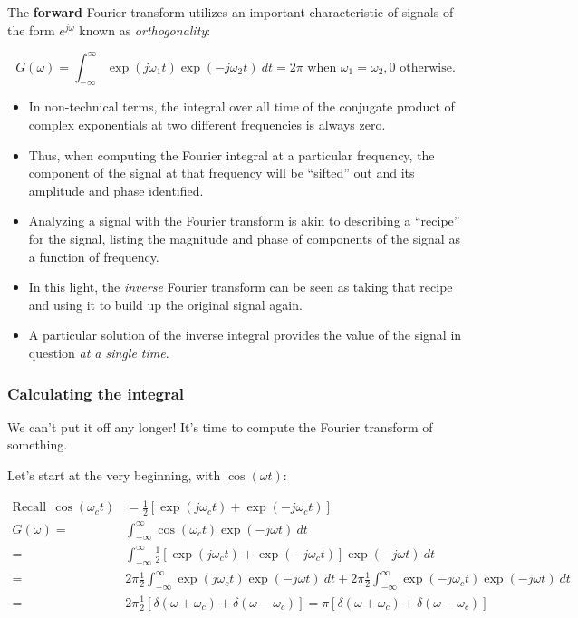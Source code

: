 \documentclass[11pt]{report}
\begin{document}
The \textbf{forward} Fourier transform utilizes an important
characteristic of signals of the form $e^{j\omega}$ known as \textit{orthogonality}:

\begin{equation*}
G(\omega)= \int^{\infty}_{-\infty}\exp(j\omega_1
t)\exp(-j\omega_2 t)~dt = 2\pi \text{ when }\omega_1=\omega_2, 0
\text{ otherwise}.
\end{equation*}

\begin{itemize}
\item In non-technical terms, the integral over all time of the
conjugate product of complex exponentials at two
different frequencies is always zero.

\item Thus, when computing the Fourier integral at a particular frequency,
the component of the signal at that frequency will be ``sifted'' out
and its amplitude and phase identified.

\item Analyzing a signal with the Fourier transform is akin to describing a
``recipe'' for the signal, listing the magnitude and phase of components of the signal as a
function of frequency.

\item In this light, the \textit{inverse} Fourier transform can be seen as taking
that recipe and using it to build up the original signal again. 

\item A particular solution of the inverse integral provides the value of
the signal in question \textit{at a single time}.

\end{itemize}

\subsubsection*{Calculating the integral}
We can't put it off any longer!  It's time to compute the Fourier
transform of something.  

Let's start at the very beginning, with $\cos(\omega t)$:

\begin{equation}
\begin{split}
\text{Recall}~~\cos(\omega_c t) &= \frac{1}{2}[\exp(j\omega_c t)+\exp(-j\omega_c t)]\\
G(\omega) =& \int^{\infty}_{-\infty}\cos(\omega_c t)\exp(-j\omega t)~dt\\
=& \int^{\infty}_{-\infty}\frac{1}{2}[\exp(j\omega_c t)+\exp(-j\omega_c
t)]\exp(-j\omega t)~dt\\
=& 2\pi\frac{1}{2}\int^{\infty}_{-\infty}\exp(j\omega_c t)\exp(-j\omega
t)~dt + 2\pi\frac{1}{2}\int^{\infty}_{-\infty}\exp(-j\omega_c t)\exp(-j\omega
t)~dt\\
=& 2\pi\frac{1}{2}[\delta(\omega+\omega_c)+\delta(\omega-\omega_c)] = 
 \pi[\delta(\omega+\omega_c)+\delta(\omega-\omega_c)]
\end{split}
\end{equation}
\end{document}
